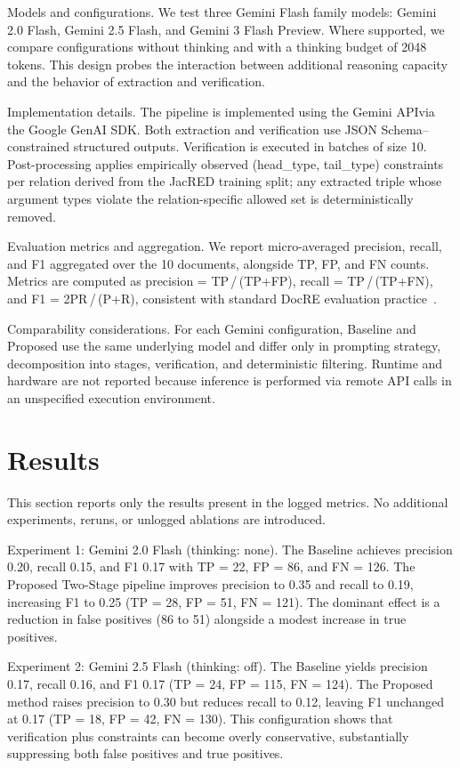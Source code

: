 \documentclass{article} %
\begin{document}
Models and configurations. We test three Gemini Flash family models: Gemini 2.0 Flash, Gemini 2.5 Flash, and Gemini 3 Flash Preview. Where supported, we compare configurations without thinking and with a thinking budget of 2048 tokens. This design probes the interaction between additional reasoning capacity and the behavior of extraction and verification.

Implementation details. The pipeline is implemented using the Gemini API\@ via the Google GenAI SDK\@. Both extraction and verification use JSON Schema–constrained structured outputs. Verification is executed in batches of size 10. Post-processing applies empirically observed (head\_type, tail\_type) constraints per relation derived from the JacRED training split; any extracted triple whose argument types violate the relation-specific allowed set is deterministically removed.

Evaluation metrics and aggregation. We report micro-averaged precision, recall, and F1 aggregated over the 10 documents, alongside TP, FP, and FN counts. Metrics are computed as precision = TP\,/\,(TP+FP), recall = TP\,/\,(TP+FN), and F1 = 2PR\,/\,(P+R), consistent with standard DocRE evaluation practice~\cite{yao-2019-docred}.

Comparability considerations. For each Gemini configuration, Baseline and Proposed use the same underlying model and differ only in prompting strategy, decomposition into stages, verification, and deterministic filtering. Runtime and hardware are not reported because inference is performed via remote API calls in an unspecified execution environment.

\section{Results}\label{sec:results}
This section reports only the results present in the logged metrics. No additional experiments, reruns, or unlogged ablations are introduced.

Experiment 1: Gemini 2.0 Flash (thinking: none). The Baseline achieves precision 0.20, recall 0.15, and F1 0.17 with TP = 22, FP = 86, and FN = 126. The Proposed Two-Stage pipeline improves precision to 0.35 and recall to 0.19, increasing F1 to 0.25 (TP = 28, FP = 51, FN = 121). The dominant effect is a reduction in false positives (86 to 51) alongside a modest increase in true positives.

Experiment 2: Gemini 2.5 Flash (thinking: off). The Baseline yields precision 0.17, recall 0.16, and F1 0.17 (TP = 24, FP = 115, FN = 124). The Proposed method raises precision to 0.30 but reduces recall to 0.12, leaving F1 unchanged at 0.17 (TP = 18, FP = 42, FN = 130). This configuration shows that verification plus constraints can become overly conservative, substantially suppressing both false positives and true positives.
\end{document}
